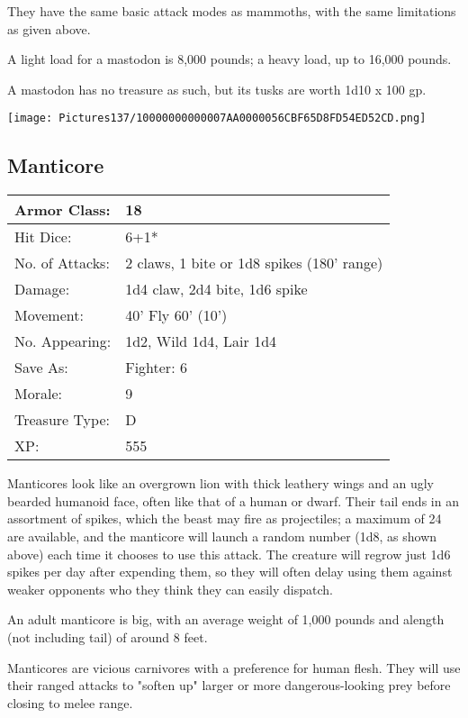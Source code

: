 \documentclass[a4paper,twoside,openany,10pt]{book}
\begin{document}
\begin{multicols}{2}
They have the same basic attack modes as mammoths, with the same limitations as given above.

A light load for a mastodon is 8,000 pounds; a heavy load, up to 16,000 pounds.

A mastodon has no treasure as such, but its tusks are worth 1d10 x 100 gp.

\begin{center} \texttt{[image: Pictures137/10000000000007AA0000056CBF65D8FD54ED52CD.png]} \end{center}


\subsection*{Manticore}\label{manticore}

\begin{tabularx}{0.50\textwidth}{@{}lX@{}}
Armor Class: & 18 \\\hline
Hit Dice: & 6+1* \\\hline
No. of Attacks: & 2 claws, 1 bite or 1d8 spikes (180' range) \\\hline
Damage: & 1d4 claw, 2d4 bite, 1d6 spike \\\hline
Movement: & 40' Fly 60' (10') \\\hline
No. Appearing: & 1d2, Wild 1d4, Lair 1d4 \\\hline
Save As: & Fighter: 6 \\\hline
Morale: & 9 \\\hline
Treasure Type: & D \\\hline
XP: & 555 \\\hline
\end{tabularx}\medskip

Manticores look like an overgrown lion with thick leathery wings and an ugly bearded humanoid face, often like that of a human or dwarf. Their tail ends in an assortment of spikes, which the beast may fire as projectiles; a maximum of 24 are available, and the manticore will launch a random number (1d8, as shown above) each time it chooses to use this attack. The creature will regrow just 1d6 spikes per day after expending them, so they will often delay using them against weaker opponents who they think they can easily dispatch.

An adult manticore is big, with an average weight of 1,000 pounds and alength (not including tail) of around 8 feet.

Manticores are vicious carnivores with a preference for human flesh. They will use their ranged attacks to "soften up" larger or more dangerous-looking prey before closing to melee range.


\end{multicols}
\end{document}
